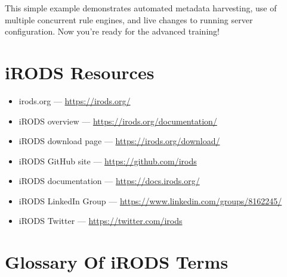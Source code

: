 \documentclass[10pt,oneside]{memoir}
\begin{document}
This simple example demonstrates automated metadata harvesting, use of multiple concurrent rule engines, and live changes to running server configuration.  Now you're ready for the advanced training!



\appendix

\chapter{iRODS Resources}

\begin{itemize}
 \item irods.org --- \url{https://irods.org/}
 \item iRODS overview  --- \url{https://irods.org/documentation/}
 \item iRODS download page  --- \url{https://irods.org/download/}
 \item iRODS GitHub site ---  \url{https://github.com/irods}
 \item iRODS documentation --- \url{https://docs.irods.org/}
 \item iRODS LinkedIn Group --- \url{https://www.linkedin.com/groups/8162245/}
 \item iRODS Twitter --- \url{https://twitter.com/irods}
\end{itemize}




\chapter{Glossary Of iRODS Terms}
\end{document}
